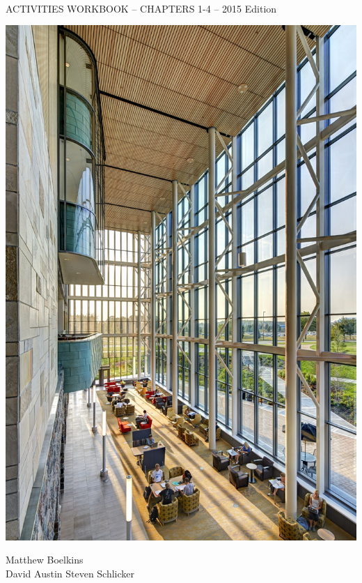 \documentclass{article}
\begin{document}
\color{covergreen}
\begin{center}
\fontsize{32pt}{48pt}\selectfont{} \\[8pt]
\fontsize{12pt}{14pt}\selectfont ACTIVITIES WORKBOOK -- CHAPTERS 1-4 -- 2015 Edition\\[10pt]
\end{center}
\begin{center}
\includegraphics[scale=.8]{ActiveCalculusCover.jpg}
\end{center}
\begin{center}
\fontsize{24pt}{32pt}\selectfont Matthew Boelkins\\
\fontsize{18pt}{24pt}\selectfont David Austin \quad Steven Schlicker
\end{center}
\end{document}
